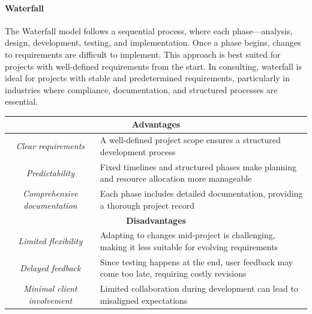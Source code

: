 \paragraph*{Waterfall}
The Waterfall model follows a sequential process, where each phase—analysis, design, development, testing, and implementation. 
Once a phase begins, changes to requirements are difficult to implement. 
This approach is best suited for projects with well-defined requirements from the start.
In consulting, waterfall is ideal for projects with stable and predetermined requirements, particularly in industries where compliance, documentation, and structured processes are essential.
\renewcommand*{\arraystretch}{1.5}
\begin{table}[!ht]
    \centering
    \begin{tabular}{|c|p{10cm}|}
    \hline
    \multicolumn{2}{|c|}{\textbf{Advantages}} \\ \hline
    \textit{Clear requirements}              & A well-defined project scope ensures a structured development process  \\ \hline
    \textit{Predictability}                  & Fixed timelines and structured phases make planning and resource allocation more manageable \\ \hline
    \textit{Comprehensive documentation}     & Each phase includes detailed documentation, providing a thorough project record \\ \hline
    \multicolumn{2}{|c|}{\textbf{Disadvantages}} \\ \hline
    \textit{Limited flexibility}             & Adapting to changes mid-project is challenging, making it less suitable for evolving requirements \\ \hline
    \textit{Delayed feedback}                & Since testing happens at the end, user feedback may come too late, requiring costly revisions \\ \hline
    \textit{Minimal client involvement}      & Limited collaboration during development can lead to misaligned expectations \\ \hline
\end{tabular}
\end{table}
\renewcommand*{\arraystretch}{1}

